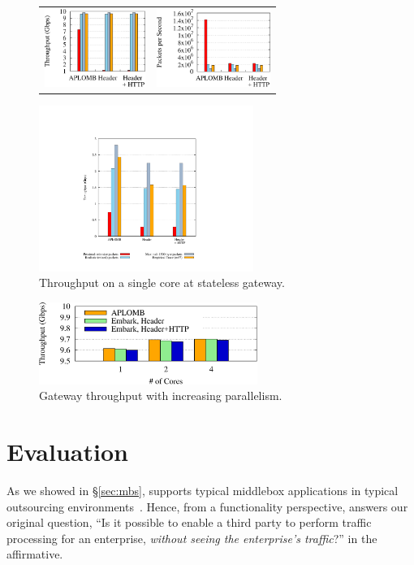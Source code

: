 \begin{figure}[t]
  \centering
  \begin{tabular}{cc}
  \includegraphics[height=1in]{fig/gateway_xput}&
  \includegraphics[height=1in]{fig/gateway_pps}\\
  \end{tabular}
  \includegraphics[width=2.75in]{fig/key}
  \caption[]{\label{fig:gwxput} Throughput on a single core at stateless gateway.}
\end{figure}

\begin{figure}[t]
  \centering
  \includegraphics[width=2.8in]{fig/gateway_scale}
  \caption[]{\label{fig:gwscale} Gateway throughput with increasing parallelism.}
\end{figure}
 
\section{Evaluation} \label{sec:eval}

As we showed in \S\ref{sec:mbs}, \sys supports typical middlebox applications in typical outsourcing environments~\cite{aplomb,etsi-nfv}. Hence, from a functionality perspective, \sys answers our original question, ``Is it possible to enable a third party to perform traffic processing for an enterprise, {\em without seeing the enterprise's traffic}?''  in the affirmative.

